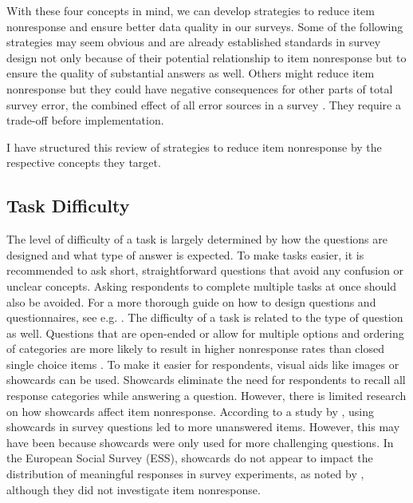 \documentclass[a4paper,12pt]{article}
\begin{document}
With these four concepts in mind, we can develop strategies to reduce item nonresponse and ensure better data quality in our surveys. Some of the following strategies may seem obvious and are already established standards in survey design not only because of their potential relationship to item nonresponse but to ensure the quality of substantial answers as well. Others might reduce item nonresponse but they could have negative consequences for other parts of total survey error, the combined effect of all error sources in a survey \citep{grovesTotalSurveyError2010}. They require a trade-off before implementation.

I have structured this review of strategies to reduce item nonresponse by the respective concepts they target.

\subsection{Task Difficulty}

The level of difficulty of a task is largely determined by how the questions are designed and what type of answer is expected. To make tasks easier, it is recommended to ask short, straightforward questions that avoid any confusion or unclear concepts. Asking respondents to complete multiple tasks at once should also be avoided. For a more thorough guide on how to design questions and questionnaires, see e.g. \citet{smythDesigningQuestionsQuestionnaires2016}. The difficulty of a task is related to the type of question as well. Questions that are open-ended or allow for multiple options and ordering of categories are more likely to result in higher nonresponse rates than closed single choice items \citep{schumanOpenClosedQuestion1979, holbrookImpactQuestionRespondent2006, holbrookInterviewerErrorsHelp2016, olsonEffectsRespondentQuestion2019, silberEffectsQuestionRespondent2021}. To make it easier for respondents, visual aids like images or showcards can be used. Showcards eliminate the need for respondents to recall all response categories while answering a question. However, there is limited research on how showcards affect item nonresponse. According to a study by \citet{holbrookInterviewerErrorsHelp2016}, using showcards in survey questions led to more unanswered items. However, this may have been because showcards were only used for more challenging questions. In the European Social Survey (ESS), showcards do not appear to impact the distribution of meaningful responses in survey experiments, as noted by \citep{jackleAssessingEffectData2010}, although they did not investigate item nonresponse.
\end{document}
